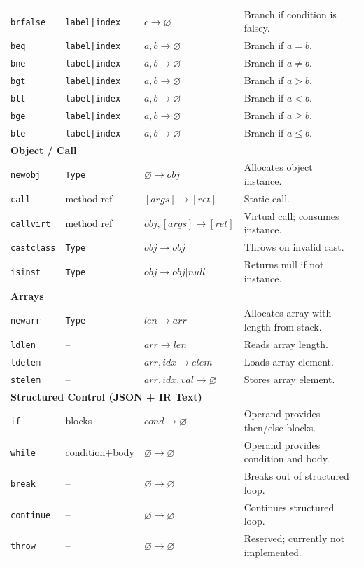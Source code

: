 \documentclass[11pt,a4paper]{article}
\begin{document}
\begin{longtable}{|l|l|l|p{6.5cm}|}
				\texttt{brfalse} & \texttt{label|index} & $c \rightarrow \varnothing$ & Branch if condition is falsey. \\
				\texttt{beq} & \texttt{label|index} & $a, b \rightarrow \varnothing$ & Branch if $a = b$. \\
				\texttt{bne} & \texttt{label|index} & $a, b \rightarrow \varnothing$ & Branch if $a \neq b$. \\
				\texttt{bgt} & \texttt{label|index} & $a, b \rightarrow \varnothing$ & Branch if $a > b$. \\
				\texttt{blt} & \texttt{label|index} & $a, b \rightarrow \varnothing$ & Branch if $a < b$. \\
				\texttt{bge} & \texttt{label|index} & $a, b \rightarrow \varnothing$ & Branch if $a \ge b$. \\
				\texttt{ble} & \texttt{label|index} & $a, b \rightarrow \varnothing$ & Branch if $a \le b$. \\
		\hline
		\multicolumn{4}{|l|}{\textbf{Object / Call}} \\
		\hline
				\texttt{newobj} & \texttt{Type} & $\varnothing \rightarrow obj$ & Allocates object instance. \\
				\texttt{call} & method ref & $[args] \rightarrow [ret]$ & Static call. \\
				\texttt{callvirt} & method ref & $obj, [args] \rightarrow [ret]$ & Virtual call; consumes instance. \\
				\texttt{castclass} & \texttt{Type} & $obj \rightarrow obj$ & Throws on invalid cast. \\
				\texttt{isinst} & \texttt{Type} & $obj \rightarrow obj|null$ & Returns null if not instance. \\
		\hline
		\multicolumn{4}{|l|}{\textbf{Arrays}} \\
		\hline
				\texttt{newarr} & \texttt{Type} & $len \rightarrow arr$ & Allocates array with length from stack. \\
				\texttt{ldlen} & -- & $arr \rightarrow len$ & Reads array length. \\
				\texttt{ldelem} & -- & $arr, idx \rightarrow elem$ & Loads array element. \\
				\texttt{stelem} & -- & $arr, idx, val \rightarrow \varnothing$ & Stores array element. \\
		\hline
		\multicolumn{4}{|l|}{\textbf{Structured Control (JSON + IR Text)}} \\
		\hline
				\texttt{if} & blocks & $cond \rightarrow \varnothing$ & Operand provides then/else blocks. \\
				\texttt{while} & condition+body & $\varnothing \rightarrow \varnothing$ & Operand provides condition and body. \\
				\texttt{break} & -- & $\varnothing \rightarrow \varnothing$ & Breaks out of structured loop. \\
				\texttt{continue} & -- & $\varnothing \rightarrow \varnothing$ & Continues structured loop. \\
				\texttt{throw} & -- & $\varnothing \rightarrow \varnothing$ & Reserved; currently not implemented. \\
		\hline
	\end{longtable}
	
\end{document}
